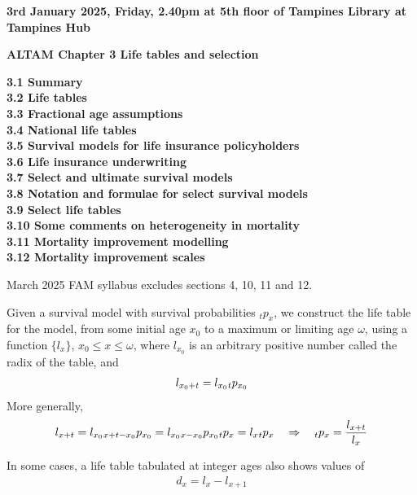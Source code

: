 \documentclass[hidelinks, 12pt]{article}
\theoremstyle{mydefstyle}
\theoremstyle{mythmstyle}
\begin{document}
\textbf{3rd January 2025, Friday, 2.40pm at 5th floor of Tampines Library at Tampines Hub}

\textbf{ALTAM Chapter 3 Life tables and selection}

\textbf{3.1 Summary} \\
\textbf{3.2 Life tables} \\
\textbf{3.3 Fractional age assumptions} \\
\textbf{3.4 National life tables} \\
\textbf{3.5 Survival models for life insurance policyholders} \\
\textbf{3.6 Life insurance underwriting} \\
\textbf{3.7 Select and ultimate survival models} \\
\textbf{3.8 Notation and formulae for select survival models} \\
\textbf{3.9 Select life tables} \\
\textbf{3.10 Some comments on heterogeneity in mortality} \\ 
\textbf{3.11 Mortality improvement modelling} \\
\textbf{3.12 Mortality improvement scales}

March 2025 FAM syllabus excludes sections 4, 10, 11 and 12. 

Given a survival model with survival probabilities $_tp_x$, we construct the life table for the model, from some initial age $x_0$ to a maximum or limiting age $\omega$, using a function $\{l_x\}$, $x_0 \le x \le \omega$, where $l_{x_0}$ is an arbitrary positive number called the radix of the table, and
\begin{gather*}
l_{x_0 + t} = l_{x_0} \hspace{0mm}_tp_{x_0}
\end{gather*}
More generally,
\begin{gather*}
l_{x+t} = l_{x_0} \hspace{0mm}_{x+t-x_0}p_{x_0}
= l_{x_0} \hspace{0mm}_{x-x_0}p_{x_0} \hspace{0mm}_tp_x
= l_x \hspace{0mm}_tp_x \quad\Rightarrow\quad \hspace{0mm}_tp_x = \frac{l_{x+t}}{l_x}
\end{gather*}

In some cases, a life table tabulated at integer ages also shows values of
\begin{gather*}
d_x = l_x - l_{x+1}
\end{gather*}
\end{document}
